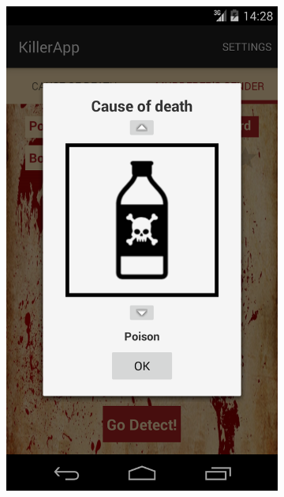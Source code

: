 \documentclass{mproj}
\begin{document}
\begin{figure}[h]
	\centering
	\begin{subfigure}{0.3\textwidth}
		\includegraphics[width=\textwidth]{images/spinner_selector}		
	\end{subfigure}		
	\quad
	\begin{subfigure}{0.3\textwidth}

\end{subfigure}
\end{figure}
\end{document}
